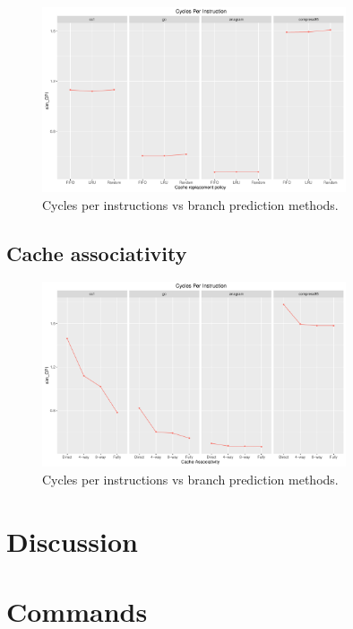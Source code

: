\documentclass[10pt]{scrartcl}
\begin{document}
\begin{figure}[h]
  \centering
  \includegraphics[width=0.8\textwidth]{Plots/plot_CacheRP_sim_CPI}
  \caption{Cycles per instructions vs branch prediction methods.}\label{fig:cache-rp_sim_cpi}
\end{figure}

\FloatBarrier

\subsection{Cache associativity}

\begin{figure}[h]
  \centering
  \includegraphics[width=0.8\textwidth]{Plots/plot_CacheA_sim_CPI}
  \caption{Cycles per instructions vs branch prediction methods.}\label{fig:cache-a_sim_cpi}
\end{figure}

\FloatBarrier

\section{Discussion}

\newpage
\section{Commands}
\end{document}
